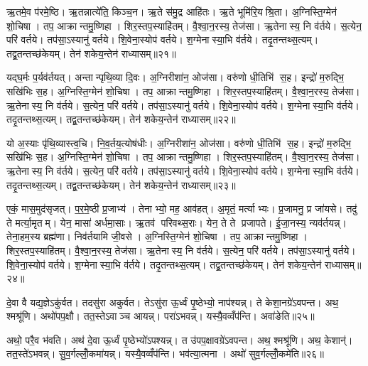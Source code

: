 ऋ॒तमे॒व प॑रमे॒ष्ठि। ऋ॒तन्नात्ये॑ति॒ किञ्च॒न। ऋ॒ते स॑मु॒द्र आहि॑तः। ऋ॒ते भूमि॑रि॒यश्रि॒ता। अ॒ग्निस्ति॒ग्मेन॑ शो॒चिषा। तप॒ आक्रान्तमु॒ष्णिहा। शिर॒स्तप॒स्याहि॑तम्। वै॒श्वा॒न॒रस्य॒ तेज॑सा। ऋ॒तेनास्य॒ नि व॑र्तये। स॒त्येन॒ परि॑ वर्तये। तप॑सा॒ऽस्यानु॑ वर्तये। शि॒वेना॒स्योप॑ वर्तये। श॒ग्मेनास्या॒भि व॑र्तये। तदृ॒तन्तथ्स॒त्यम्। तद्व्र॒तन्तच्छ॑केयम्। तेन॑ शकेय॒न्तेन॑ राध्यासम्॥२१॥

यद्घ॒र्मः प॒र्यव॑र्तयत्। अन्तान्पृथि॒व्या दि॒वः। अ॒ग्निरीशा॑न॒ ओज॑सा। वरु॑णो धी॒तिभि॑ स॒ह। इन्द्रो॑ म॒रुद्भि॒ सखि॑भिः स॒ह। अ॒ग्निस्ति॒ग्मेन॑ शो॒चिषा। तप॒ आक्रान्तमु॒ष्णिहा। शिर॒स्तप॒स्याहि॑तम्। वै॒श्वा॒न॒रस्य॒ तेज॑सा। ऋ॒तेनास्य॒ नि व॑र्तये। स॒त्येन॒ परि॑ वर्तये। तप॑सा॒ऽस्यानु॑ वर्तये। शि॒वेना॒स्योप॑ वर्तये। श॒ग्मेनास्या॒भि व॑र्तये। तदृ॒तन्तथ्स॒त्यम्। तद्व्र॒तन्तच्छ॑केयम्। तेन॑ शकेय॒न्तेन॑ राध्यासम्॥२२॥

यो अ॒स्याः पृ॑थि॒व्यास्त्व॒चि। नि॒व॒र्तय॒त्योष॑धीः। अ॒ग्निरीशा॑न॒ ओज॑सा। वरु॑णो धी॒तिभि॑ स॒ह। इन्द्रो॑ म॒रुद्भि॒ सखि॑भिः स॒ह। अ॒ग्निस्ति॒ग्मेन॑ शो॒चिषा। तप॒ आक्रान्तमु॒ष्णिहा। शिर॒स्तप॒स्याहि॑तम्। वै॒श्वा॒न॒रस्य॒ तेज॑सा। ऋ॒तेनास्य॒ नि व॑र्तये। स॒त्येन॒ परि॑ वर्तये। तप॑सा॒ऽस्यानु॑ वर्तये। शि॒वेना॒स्योप॑ वर्तये। श॒ग्मेनास्या॒भि व॑र्तये। तदृ॒तन्तथ्स॒त्यम्। तद्व्र॒तन्तच्छ॑केयम्। तेन॑ शकेय॒न्तेन॑ राध्यासम्॥२३॥

एकं॒ मास॒मुद॑सृजत्। प॒र॒मे॒ष्ठी प्र॒जाभ्य॑। तेनाभ्यो॒ मह॒ आव॑हत्। अ॒मृतं॒ मर्त्याभ्यः। प्र॒जामनु॒ प्र जा॑यसे। तदु॑ ते मर्त्या॒मृतम्। येन॒ मासा॑ अर्धमा॒साः। ऋ॒तव॑ परिवथ्स॒राः। येन॒ ते ते प्रजापते। ई॒जा॒नस्य॒ न्यव॑र्तयन्न्। तेना॒हम॒स्य ब्रह्म॑णा। निव॑र्तयामि जी॒वसे। अ॒ग्निस्ति॒ग्मेन॑ शो॒चिषा। तप॒ आक्रान्तमु॒ष्णिहा। शिर॒स्तप॒स्याहि॑तम्। वै॒श्वा॒न॒रस्य॒ तेज॑सा। ऋ॒तेनास्य॒ नि व॑र्तये। स॒त्येन॒ परि॑ वर्तये। तप॑सा॒ऽस्यानु॑ वर्तये। शि॒वेना॒स्योप॑ वर्तये। श॒ग्मेनास्या॒भि व॑र्तये। तदृ॒तन्तथ्स॒त्यम्। तद्व्र॒तन्तच्छ॑केयम्। तेन॑ शकेय॒न्तेन॑ राध्यासम्॥२४॥

दे॒वा वै यद्य॒ज्ञेऽकु॑र्वत। तदसु॑रा अकुर्वत। तेऽसु॑रा ऊ॒र्ध्वं पृ॒ष्ठेभ्यो॒ नाप॑श्यन्न्। ते केशा॒नग्रे॑ऽवपन्त। अथ॒ श्मश्रू॑णि। अथो॑पप॒क्षौ। तत॒स्तेऽवाञ्च आयन्न्। परा॑ऽभवन्न्। यस्यै॒वव्वँप॑न्ति। अवा॑ङेति॥२५॥

अथो॒ परै॒व भ॑वति। अथ॑ दे॒वा ऊ॒र्ध्वं पृ॒ष्ठेभ्यो॑ऽपश्यन्न्। त उ॑पप॒क्षावग्रे॑ऽवपन्त। अथ॒ श्मश्रू॑णि। अथ॒ केशान्॑। तत॒स्ते॑ऽभवन्न्। सु॒व॒र्गल्लोँ॒कमा॑यन्न्। यस्यै॒वव्वँप॑न्ति। भव॑त्या॒त्मना। अथो॑ सुव॒र्गल्लोँ॒कमे॑ति॥२६॥

